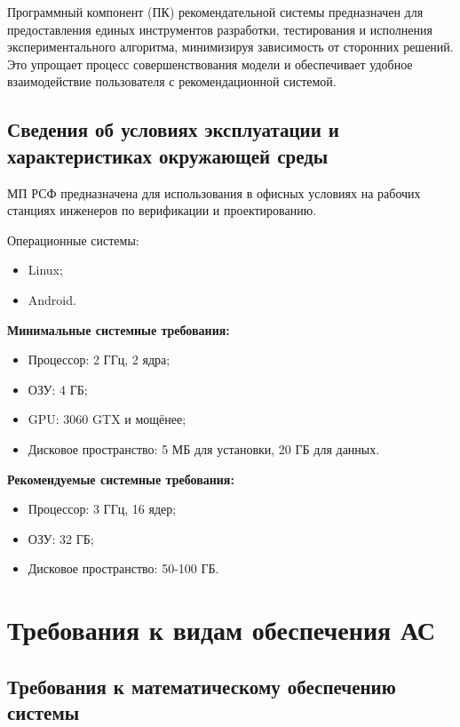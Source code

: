 Программный компонент (ПК) рекомендательной системы предназначен для предоставления
единых инструментов разработки, тестирования и исполнения экспериментального алгоритма,
минимизируя зависимость от сторонних решений. Это упрощает процесс совершенствования модели
и обеспечивает удобное взаимодействие пользователя с рекомендационной системой.

\subsection{Сведения об условиях эксплуатации
	и характеристиках окружающей среды}

МП РСФ предназначена для использования в офисных условиях
на рабочих станциях инженеров по верификации и проектированию.

Операционные системы:

\begin{itemize}
	\item Linux;
	\item Android.
\end{itemize}

\textbf{Минимальные системные требования:}

\begin{itemize}
	\item Процессор: 2 ГГц, 2 ядра;
	\item ОЗУ: 4 ГБ;
	\item GPU: 3060 GTX и мощёнее;
	\item Дисковое пространство: 5 МБ для установки, 20 ГБ для данных.
\end{itemize}

\textbf{Рекомендуемые системные требования:}

\begin{itemize}
	\item Процессор: 3 ГГц, 16 ядер;
	\item ОЗУ: 32 ГБ;
	\item Дисковое пространство: 50-100 ГБ.
\end{itemize}


\section{Требования к видам обеспечения АС}


\subsection{Требования к математическому обеспечению системы}

